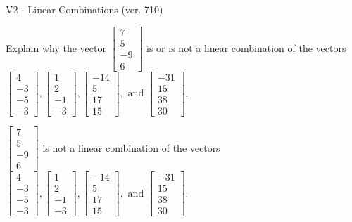\begin{exercise}
  \begin{exerciseTitle}V2 - Linear Combinations (ver. 710)\end{exerciseTitle}
  \begin{exerciseStatement}
    Explain why the vector \(\left[\begin{array}{c}
7 \\
5 \\
-9 \\
6
\end{array}\right]\)  is or is not a linear 
	combination of the vectors \(\left[\begin{array}{c}
4 \\
-3 \\
-5 \\
-3
\end{array}\right] , \left[\begin{array}{c}
1 \\
2 \\
-1 \\
-3
\end{array}\right] , \left[\begin{array}{c}
-14 \\
5 \\
17 \\
15
\end{array}\right] , \text{ and } \left[\begin{array}{c}
-31 \\
15 \\
38 \\
30
\end{array}\right]\).
	


  \end{exerciseStatement}
  \begin{exerciseAnswer}
   \(\left[\begin{array}{c}
7 \\
5 \\
-9 \\
6
\end{array}\right]\) 
  	 is not  
	a linear combination of the vectors \(\left[\begin{array}{c}
4 \\
-3 \\
-5 \\
-3
\end{array}\right] , \left[\begin{array}{c}
1 \\
2 \\
-1 \\
-3
\end{array}\right] , \left[\begin{array}{c}
-14 \\
5 \\
17 \\
15
\end{array}\right] , \text{ and } \left[\begin{array}{c}
-31 \\
15 \\
38 \\
30
\end{array}\right]\).


\end{exerciseAnswer}
\end{exercise}
